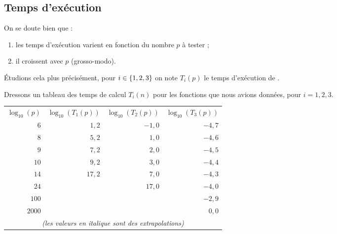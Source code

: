 \subsection{Temps d'exécution}

On se doute bien que :
\begin{enumerate}
\item les temps d'exécution varient en fonction du nombre $p$ à tester ;
\item il croissent avec $p$ (grosso-modo).
\end{enumerate}

\'Etudions cela plus précisément, pour $i \in \left\{ 1,2,3 \right\}$ on note $T_i(p)$ le temps d'exécution de .



Dressons un tableau des temps de calcul $T_{i}(n)$ pour les fonctions
que nous avions données, pour $i=1, 2, 3$.

\begin{center}
\begin{tabular}{rrrr}
  $\log_{10}(p)$ & $\log_{10}(T_1(p))$& $\log_{10}(T_2(p))$ & $\log_{10}(T_3(p))$\\
$6$     & $1,2$         & $-1,0$        & $-4,7$\\
$8$     &$\mathit{5,2}$   & $1,0$         & $-4,6$\\
$9$     &$\mathit{7,2}$   & $\mathit{2,0}$  & $-4,5$\\
$10$    & $\mathit{9,2}$  & $\mathit{3,0}$  & $-4,4$\\
$14$    & $\mathit{17,2}$ & $\mathit{7,0}$  & $-4,3$\\
$24$    & %
                        & $\mathit{17,0}$ & $-4,0$\\
$100$ & & %
                        & $-2,9$\\
$2000$ & & & $0,0$\\
\multicolumn{4}{c}{\emph{(les valeurs en italique sont des extrapolations)}}\\
\end{tabular}
\end{center}

